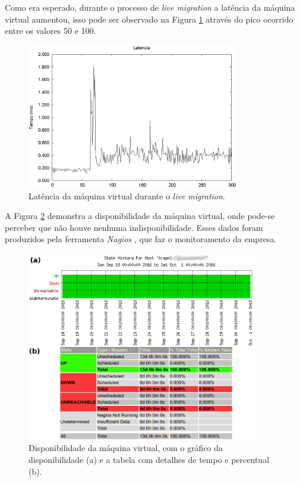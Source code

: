 Como era esperado, durante o processo de \textit{live migration} a latência da máquina virtual aumentou, isso pode ser observado na Figura 
\ref{fig:teste2_latencia} através do pico ocorrido entre os valores 50 e 100.
\begin{figure}[h!]
 \centering
 \includegraphics[width=350px]{img/teste2_latencia.eps}
 \caption{Latência da máquina virtual durante o \textit{live migration}.}
 \label{fig:teste2_latencia}
\end{figure}

A Figura \ref{fig:teste2_trapel1} demonstra a disponibilidade da máquina virtual, onde pode-se perceber que não houve nenhuma indisponibilidade. 
Esses dados foram produzidos pela ferramenta \textit{Nagios} \cite{nagios}, que faz o monitoramento da empresa. 
\begin{figure}[h!]
 \centering
 \includegraphics[width=380px]{img/teste2_trapel1.eps}
 \caption{Disponibilidade da máquina virtual, com o gráfico da disponibilidade (a) e a tabela com detalhes de tempo e percentual (b).}
 \label{fig:teste2_trapel1}
\end{figure}

